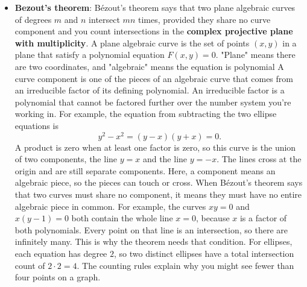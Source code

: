 \documentclass{report}
\begin{document}
\begin{itemize}
            \bigbreak \noindent 
            In Euclidean geometry however, they are distinct, and have an important difference. Algebraically, an ellipse is described by a second-degree equation. It is therefore expected, and true that two ellipses will most generally intersect in four points. However, it is geometrically evident that two distinct circles can not intersect in more than two points. Algebraically, we are intersecting two second-degree curves here, or equivalently solving two quadratic equations. We should expect to get four solutions. The question is, what is special about circles that they only intersect in two points.
        \item \textbf{Bezout's theorem}: Bézout’s theorem says that two plane algebraic curves of degrees \(m\) and \(n\) intersect \(mn\) times, provided they share no curve component and you count intersections in the \textbf{complex projective plane with multiplicity}.
            \bigbreak \noindent 
            A plane algebraic curve is the set of points \((x,y)\) in a plane that satisfy a polynomial equation \(F(x,y)=0\). "Plane" means there are two coordinates, and "algebraic" means the equation is polynomial
            \bigbreak \noindent 
            A curve component is one of the pieces of an algebraic curve that comes from an irreducible factor of its defining polynomial. An irreducible factor is a polynomial that cannot be factored further over the number system you’re working in.
            \bigbreak \noindent 
            For example, the equation from subtracting the two ellipse equations is
            \[
                y^2-x^2=(y-x)(y+x)=0.
            \]
            A product is zero when at least one factor is zero, so this curve is the union of two components, the line \(y=x\) and the line \(y=-x\). The lines cross at the origin and are still separate components. Here, a component means an algebraic piece, so the pieces can touch or cross.
            \bigbreak \noindent 
            When Bézout’s theorem says that two curves must share no component, it means they must have no entire algebraic piece in common. For example, the curves \(xy=0\) and \(x(y-1)=0\) both contain the whole line \(x=0\), because \(x\) is a factor of both polynomials. Every point on that line is an intersection, so there are infinitely many. This is why the theorem needs that condition.
            \bigbreak \noindent 
            For ellipses, each equation has degree \(2\), so two distinct ellipses have a total intersection count of \(2\cdot 2=4\). The counting rules explain why you might see fewer than four points on a graph.

\end{itemize}
\end{document}
